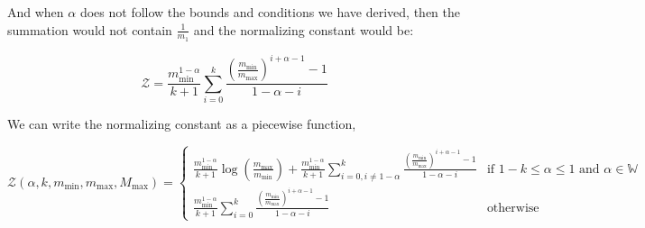 \documentclass{article}
\newcommand{\mmin}{m_\text{min}}
\newcommand{\mmax}{m_\text{max}}
\newcommand{\Mmax}{M_\text{max}}
\newcommand{\Z}{\mathcal{Z}}
\begin{document}
And when \(\alpha\) does not follow the bounds and conditions we have derived, then the summation would not contain \(\displaystyle\frac{1}{m_1}\) and the normalizing constant would be:

\begin{equation}
    \Z = \frac{\mmin^{1-\alpha}}{k+1}\sum\limits_{i=0}^{k}\frac{\displaystyle{\left(\frac{\mmin}{\mmax}\right)}^{i+\alpha-1}-1}{1-\alpha-i}
\end{equation}

We can write the normalizing constant as a piecewise function,

\begin{equation}
    \Z(\alpha,k,\mmin,\mmax,\Mmax) = \begin{cases}
        \displaystyle\frac{\mmin^{1-\alpha}}{k+1}\log{\left(\frac{\mmax}{\mmin}\right)}+\frac{\mmin^{1-\alpha}}{k+1}\sum\limits_{i=0,i\neq 1-\alpha}^{k}\frac{\displaystyle{\left(\frac{\mmin}{\mmax}\right)}^{i+\alpha-1}-1}{1-\alpha-i} & \text{if } 1-k\le \alpha\le 1 \text{ and } \alpha\in\mathbb{W} \\
        \displaystyle\frac{\mmin^{1-\alpha}}{k+1}\sum\limits_{i=0}^{k}\frac{\displaystyle{\left(\frac{\mmin}{\mmax}\right)}^{i+\alpha-1}-1}{1-\alpha-i}                                                                                   & \text{otherwise}
    \end{cases}
\end{equation}
\end{document}
